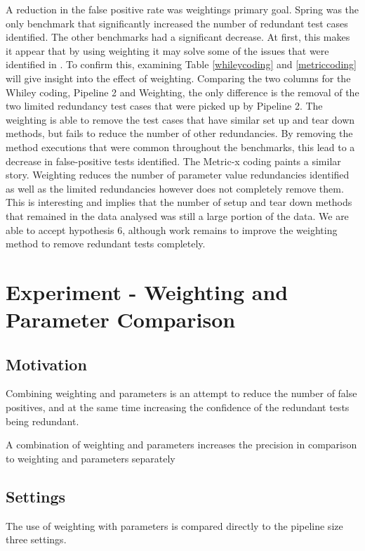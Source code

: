 A reduction in the false positive rate was weightings primary goal. Spring was the only benchmark that significantly increased the number of redundant test cases identified. The other benchmarks had a significant decrease. At first, this makes it appear that by using weighting it may solve some of the issues that were identified in \cite{koochakzadeh2009test} \cite{li2008static}. To confirm this, examining Table \ref{whileycoding} and \ref{metriccoding} will give insight into the effect of weighting. Comparing the two columns for the Whiley coding, Pipeline 2 and Weighting, the only difference is the removal of the two limited redundancy test cases that were picked up by Pipeline 2. The weighting is able to remove the test cases that have similar set up and tear down methods, but fails to reduce the number of other redundancies. By removing the method executions that were common throughout the benchmarks, this lead to a decrease in false-positive tests identified. The Metric-x coding paints a similar story. Weighting reduces the number of parameter value redundancies identified as well as the limited redundancies however does not completely remove them. This is interesting and implies that the number of setup and tear down methods that remained in the data analysed was still a large portion of the data. We are able to accept hypothesis 6, although work remains to improve the weighting method to remove redundant tests completely.


\section{Experiment  - Weighting and Parameter Comparison}

\subsection{Motivation}
Combining weighting and parameters is an attempt to reduce the number of false positives, and at the same time increasing the confidence of the redundant tests being redundant. 

\begin{hyp}
A combination of weighting and parameters increases the precision in comparison to weighting and parameters separately
\end{hyp}

\subsection{Settings}
The use of weighting with parameters is compared directly to the pipeline size three settings.

